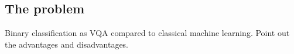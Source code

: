 \subsection{The problem}
Binary classification as VQA compared to classical machine learning. Point out the advantages and disadvantages.

